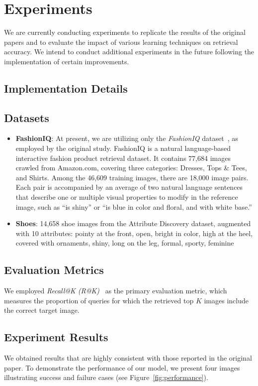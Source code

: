 \section{Experiments}
We are currently conducting experiments to replicate the results of the original papers and to evaluate the impact of various learning techniques on retrieval accuracy. We intend to conduct additional experiments in the future following the implementation of certain improvements.

\subsection{Implementation Details}

\subsection{Datasets}
\begin{itemize}
    \item \textbf{FashionIQ}: At present, we are utilizing only the \textit{FashionIQ} dataset~\cite{wu2020}, as employed by the original study. FashionIQ is a natural language-based interactive fashion product retrieval dataset. It contains 77,684 images crawled from Amazon.com, covering three categories: Dresses, Tops \& Tees, and Shirts. Among the 46,609 training images, there are 18,000 image pairs. Each pair is accompanied by an average of two natural language sentences that describe one or multiple visual properties to modify in the reference image, such as ``is shiny'' or ``is blue in color and floral, and with white base.''
    \item \textbf{Shoes}: 14,658 shoe images from the Attribute Discovery dataset, augmented with 10 attributes: pointy at the front, open, bright in color, high at the heel, covered with ornaments, shiny, long on the leg, formal, sporty, feminine
\end{itemize}

\subsection{Evaluation Metrics}
We employed \textit{Recall@K (R@K)}~\cite{patel2022} as the primary evaluation metric, which measures the proportion of queries for which the retrieved top \(K\) images include the correct target image.

\subsection{Experiment Results}


We obtained results that are highly consistent with those reported in the original paper. To demonstrate the performance of our model, we present four images illustrating success and failure cases (see Figure~\ref{fig:performance}).
